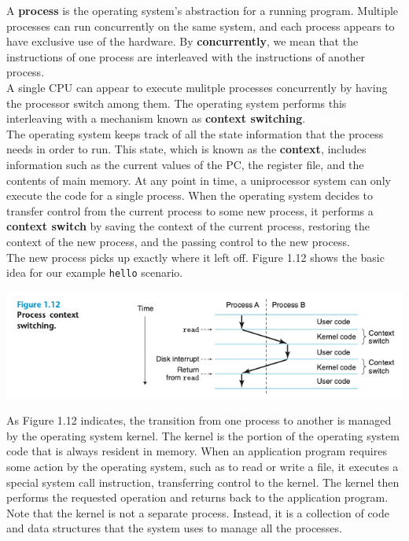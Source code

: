 \documentclass[11pt]{article}
\begin{document}
A \textbf{process} is the operating system’s abstraction for a running program. Multiple processes can run concurrently on the same system, and each process appears to have exclusive use of the hardware. By \textbf{concurrently}, we mean that the instructions of one process are interleaved with the instructions of another process.\\

A single CPU can appear to execute mulitple processes concurrently by having the processor switch among them. The operating system performs this interleaving with a mechanism known as \textbf{context switching}.\\


The operating system keeps track of all the state information that the process needs in order to run. This state, which is known as the \textbf{context}, includes information such as the current values of the PC, the register file, and the contents of main memory. At any point in time, a uniprocessor system can only execute the code for a single process. When the operating system decides to transfer control from the current process to some new process, it performs a \textbf{context  switch} by saving the context of the current process, restoring the context of the new process, and the passing control to the new process.\\
The new process picks up exactly where it left off. Figure 1.12 shows the basic idea for our example \texttt{hello} scenario.\\

\begin{center}
\includegraphics[width=.9\linewidth]{pics/process-context-switching.png}
\end{center}

As Figure 1.12 indicates, the transition from one process to another is managed by the operating system kernel. The kernel is the portion of the operating system code that is always resident in memory. When an application program requires some action by the operating system, such as to read or write a file, it executes a special system call instruction, transferring control to the kernel. The kernel then performs the requested operation and returns back to the application program. Note that the kernel is not a separate process. Instead, it is a collection of code and data structures that the system uses to manage all the processes.\\
\end{document}
